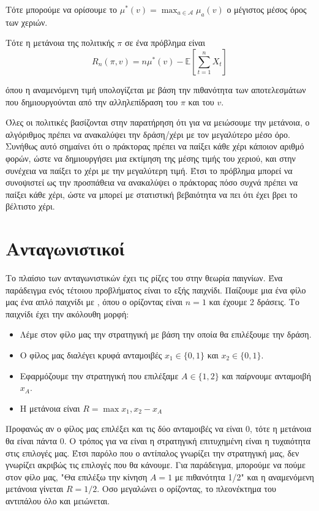 Τότε μπορούμε να ορίσουμε το $μ^*(v) = \max_{a\in \mathcal{A}}μ_a(v)$ ο μέγιστος μέσος όρος των χεριών.

Τότε η μετάνοια της πολιτικής $π$ σε ένα πρόβλημα  είναι
\begin{equation}
    R_n(π,v) = nμ^*(v) - \mathbb{E}\left[ \sum_{t=1}^{n} X_t \right]
\end{equation}

όπου η αναμενόμενη τιμή υπολογίζεται με βάση την πιθανότητα των αποτελεσμάτων που δημιουργούνται από την αλληλεπίδραση του $π$ και του $v$.

Όλες οι πολιτικές βασίζονται στην παρατήρηση ότι για να μειώσουμε την μετάνοια, ο αλγόριθμος πρέπει να ανακαλύψει την δράση/χέρι με τον μεγαλύτερο μέσο όρο. Συνήθως αυτό σημαίνει ότι ο πράκτορας πρέπει να παίξει κάθε χέρι κάποιον αριθμό φορών, ώστε να δημιουργήσει μια εκτίμηση της μέσης τιμής του χεριού, και στην συνέχεια να παίξει το χέρι με την μεγαλύτερη τιμή. Έτσι το πρόβλημα μπορεί να συνοψιστεί ως την προσπάθεια να ανακαλύψει ο πράκτορας πόσο συχνά πρέπει να παίξει κάθε χέρι, ώστε να μπορεί με στατιστική βεβαιότητα να πει ότι έχει βρει το βέλτιστο χέρι.

\section{Ανταγωνιστικοί }

Το πλαίσιο των ανταγωνιστικών  έχει τις ρίζες του στην θεωρία παιγνίων. Ένα παράδειγμα ενός τέτοιου προβλήματος είναι το εξής παιχνίδι. Παίζουμε μια ένα φίλο μας ένα απλό παιχνίδι με , όπου ο ορίζοντας είναι $n=1$ και έχουμε 2 δράσεις. Το παιχνίδι έχει την ακόλουθη μορφή:
\begin{itemize}
    \item Λέμε στον φίλο μας την στρατηγική με βάση την οποία θα επιλέξουμε την δράση.
    \item Ο φίλος μας διαλέγει κρυφά ανταμοιβές $x_1 \in \{0,1\}$ και $x_2 \in \{0,1\}$.
    \item Εφαρμόζουμε την στρατηγική που επιλέξαμε $A \in \{1,2\}$ και παίρνουμε ανταμοιβή $x_A$.
    \item Η μετάνοια είναι $R = \max{x_1,x_2} - x_A$
\end{itemize}

Προφανώς αν ο φίλος μας επιλέξει και τις δύο ανταμοιβές να είναι 0, τότε η μετάνοια θα είναι πάντα 0. Ο τρόπος για να είναι η στρατηγική επιτυχημένη είναι η τυχαιότητα στις επιλογές μας. Έτσι παρόλο που ο αντίπαλος γνωρίζει την στρατηγική μας, δεν γνωρίζει ακριβώς τις επιλογές που θα κάνουμε. Για παράδειγμα, μπορούμε να πούμε στον φίλο μας, "Θα επιλέξω την κίνηση $A=1$ με πιθανότητα 1/2" και η αναμενόμενη μετάνοια γίνεται $R=1/2$.  Οσο μεγαλώνει ο ορίζοντας, το πλεονέκτημα του αντιπάλου όλο και μειώνεται.

